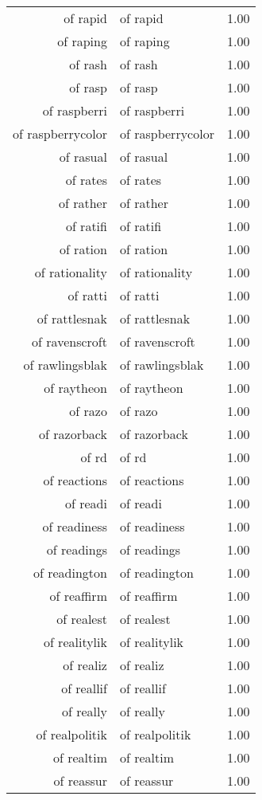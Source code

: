 \begin{table}[ht]
\begin{tabular}{rlr}
  of rapid & of rapid & 1.00 \\ 
  of raping & of raping & 1.00 \\ 
  of rash & of rash & 1.00 \\ 
  of rasp & of rasp & 1.00 \\ 
  of raspberri & of raspberri & 1.00 \\ 
  of raspberrycolor & of raspberrycolor & 1.00 \\ 
  of rasual & of rasual & 1.00 \\ 
  of rates & of rates & 1.00 \\ 
  of rather & of rather & 1.00 \\ 
  of ratifi & of ratifi & 1.00 \\ 
  of ration & of ration & 1.00 \\ 
  of rationality & of rationality & 1.00 \\ 
  of ratti & of ratti & 1.00 \\ 
  of rattlesnak & of rattlesnak & 1.00 \\ 
  of ravenscroft & of ravenscroft & 1.00 \\ 
  of rawlingsblak & of rawlingsblak & 1.00 \\ 
  of raytheon & of raytheon & 1.00 \\ 
  of razo & of razo & 1.00 \\ 
  of razorback & of razorback & 1.00 \\ 
  of rd & of rd & 1.00 \\ 
  of reactions & of reactions & 1.00 \\ 
  of readi & of readi & 1.00 \\ 
  of readiness & of readiness & 1.00 \\ 
  of readings & of readings & 1.00 \\ 
  of readington & of readington & 1.00 \\ 
  of reaffirm & of reaffirm & 1.00 \\ 
  of realest & of realest & 1.00 \\ 
  of realitylik & of realitylik & 1.00 \\ 
  of realiz & of realiz & 1.00 \\ 
  of reallif & of reallif & 1.00 \\ 
  of really & of really & 1.00 \\ 
  of realpolitik & of realpolitik & 1.00 \\ 
  of realtim & of realtim & 1.00 \\ 
  of reassur & of reassur & 1.00 \\ 

\end{tabular}
\end{table}
